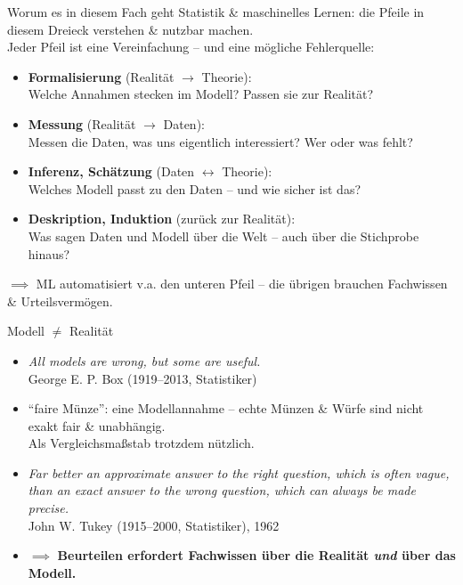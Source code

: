 \documentclass[
  10pt,
  ignorenonframetext,
]{beamer}
\providecommand{\tightlist}{%
  \setlength{\itemsep}{0pt}\setlength{\parskip}{0pt}}
\begin{document}
\begin{frame}{Worum es in diesem Fach geht}
\protect\hypertarget{worum-es-in-diesem-fach-geht}{}
Statistik \& maschinelles Lernen: die Pfeile in diesem Dreieck verstehen
\& nutzbar machen.\\
Jeder Pfeil ist eine Vereinfachung -- und eine mögliche Fehlerquelle:

\begin{itemize}
\tightlist
\item
  \textbf{Formalisierung} (Realität \(\rightarrow\) Theorie):\\
  Welche Annahmen stecken im Modell? Passen sie zur Realität?
\item
  \textbf{Messung} (Realität \(\rightarrow\) Daten):\\
  Messen die Daten, was uns eigentlich interessiert? Wer oder was fehlt?
\item
  \textbf{Inferenz, Schätzung} (Daten \(\leftrightarrow\) Theorie):\\
  Welches Modell passt zu den Daten -- und wie sicher ist das?
\item
  \textbf{Deskription, Induktion} (zurück zur Realität):\\
  Was sagen Daten und Modell über die Welt -- auch über die Stichprobe
  hinaus?
\end{itemize}

\(\implies\) ML automatisiert v.a. den unteren Pfeil -- die übrigen
brauchen Fachwissen \& Urteilsvermögen.
\end{frame}

\begin{frame}{Modell \(\neq\) Realität}
\protect\hypertarget{modell-neq-realituxe4t}{}
\begin{itemize}[<+->]
\tightlist
\item
  \emph{All models are wrong, but some are useful.}\\
  George E. P. Box (1919--2013, Statistiker)
\end{itemize}

\begin{itemize}[<+->]
\tightlist
\item
  ``faire Münze'': eine Modellannahme -- echte Münzen \& Würfe sind
  nicht exakt fair \& unabhängig.\\
  Als Vergleichsmaßstab trotzdem nützlich.
\item
  \emph{Far better an approximate answer to the right question, which is
  often vague, than an exact answer to the wrong question, which can
  always be made precise.}\\
  John W. Tukey (1915--2000, Statistiker), 1962
\item
  \(\implies\) \textbf{Beurteilen erfordert Fachwissen über die Realität
  \emph{und} über das Modell.}
\end{itemize}
\end{frame}
\end{document}
